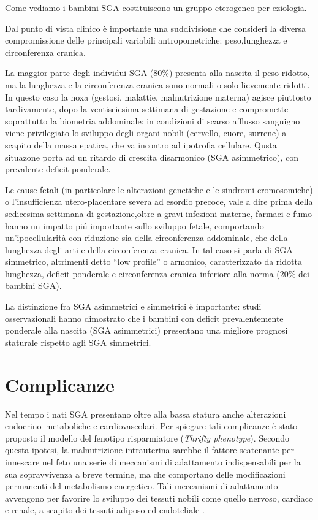 Come vediamo i bambini SGA costituiscono un gruppo eterogeneo per eziologia.

Dal punto di vista clinico è importante una suddivisione che consideri la diversa compromissione delle principali variabili antropometriche: peso,lunghezza e circonferenza cranica.

La maggior parte degli individui SGA (80\%) presenta alla nascita il peso ridotto, ma la lunghezza e la circonferenza cranica sono normali o solo lievemente ridotti.
In questo caso la noxa (gestosi, malattie, malnutrizione materna) agisce piuttosto tardivamente, dopo la ventiseiesima settimana di gestazione e compromette soprattutto la biometria addominale: in condizioni di scarso afflusso sanguigno viene privilegiato lo sviluppo degli organi nobili (cervello, cuore, surrene) a scapito della massa epatica, che va incontro ad ipotrofia cellulare. 
Qusta situazone porta ad un ritardo di crescita disarmonico (SGA asimmetrico), con prevalente deficit ponderale.

Le cause fetali (in particolare le alterazioni genetiche e le sindromi cromosomiche) o l'insufficienza utero-placentare severa ad esordio 
precoce, vale a dire prima della sedicesima settimana di gestazione,oltre a gravi infezioni materne, farmaci e fumo  hanno un impatto pi\'u importante sullo sviluppo fetale, comportando un'ipocellularità con riduzione sia della circonferenza addominale, che della lunghezza degli arti e della circonferenza cranica. In tal caso si parla di SGA simmetrico, altrimenti detto "`low profile"' o armonico, caratterizzato da ridotta lunghezza, deficit ponderale e circonferenza cranica inferiore alla norma (20\% dei bambini SGA).

La distinzione fra SGA asimmetrici e simmetrici \`e importante: studi osservazionali 
hanno dimostrato che i bambini con deficit prevalentemente ponderale alla nascita 
(SGA asimmetrici) presentano una migliore prognosi staturale rispetto agli SGA simmetrici.\cite{sga-10}

\section{Complicanze}

Nel tempo i nati SGA presentano oltre alla bassa statura anche alterazioni endocrino--metaboliche e cardiovascolari. 
Per spiegare tali complicanze è stato proposto il modello del fenotipo risparmiatore (\textit{Thrifty phenotype}).
Secondo questa ipotesi, la malnutrizione intrauterina sarebbe il fattore scatenante
per innescare nel feto una serie di meccanismi di adattamento indispensabili per 
la sua sopravvivenza a breve termine, ma che comportano delle modificazioni permanenti
del metabolismo energetico.
Tali meccanismi di adattamento avvengono per favorire lo sviluppo dei tessuti 
nobili come quello nervoso, cardiaco e renale, a scapito dei tessuti adiposo ed endoteliale .


